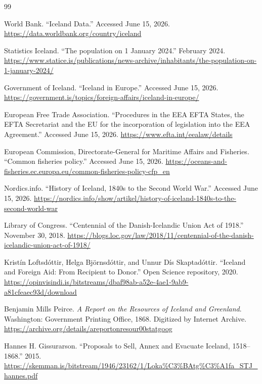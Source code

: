 \documentclass[11pt,a4paper]{article}
\begin{document}
\newpage
\begingroup
\raggedright
\begin{thebibliography}{99}

World Bank. ``Iceland Data.'' Accessed June 15, 2026.
\url{https://data.worldbank.org/country/iceland}

Statistics Iceland. ``The population on 1 January 2024.'' February 2024.
\url{https://www.statice.is/publications/news-archive/inhabitants/the-population-on-1-january-2024/}

Government of Iceland. ``Iceland in Europe.'' Accessed June 15, 2026.
\url{https://government.is/topics/foreign-affairs/iceland-in-europe/}

European Free Trade Association. ``Procedures in the EEA EFTA States, the EFTA Secretariat and the EU for the incorporation of legislation into the EEA Agreement.'' Accessed June 15, 2026.
\url{https://www.efta.int/eealaw/details}

European Commission, Directorate-General for Maritime Affairs and Fisheries. ``Common fisheries policy.'' Accessed June 15, 2026.
\url{https://oceans-and-fisheries.ec.europa.eu/common-fisheries-policy-cfp_en}

Nordics.info. ``History of Iceland, 1840s to the Second World War.'' Accessed June 15, 2026.
\url{https://nordics.info/show/artikel/history-of-iceland-1840s-to-the-second-world-war}

Library of Congress. ``Centennial of the Danish-Icelandic Union Act of 1918.'' November 30, 2018.
\url{https://blogs.loc.gov/law/2018/11/centennial-of-the-danish-icelandic-union-act-of-1918/}

Kristín Loftsdóttir, Helga Björnsdóttir, and Unnur Dís Skaptadóttir. ``Iceland and Foreign Aid: From Recipient to Donor.'' Open Science repository, 2020.
\url{https://opinvisindi.is/bitstreams/dbaf98ab-a52e-4ae1-9ab9-a81cfeaec93d/download}

Benjamin Mills Peirce. \textit{A Report on the Resources of Iceland and Greenland}. Washington: Government Printing Office, 1868. Digitized by Internet Archive.
\url{https://archive.org/details/areportonresour00statgoog}

Hannes H. Gissurarson. ``Proposals to Sell, Annex and Evacuate Iceland, 1518--1868.'' 2015.
\url{https://skemman.is/bitstream/1946/23162/1/Loka%C3%BAtg%C3%A1fa_STJ_hannes.pdf}


\end{thebibliography}
\end{document}
